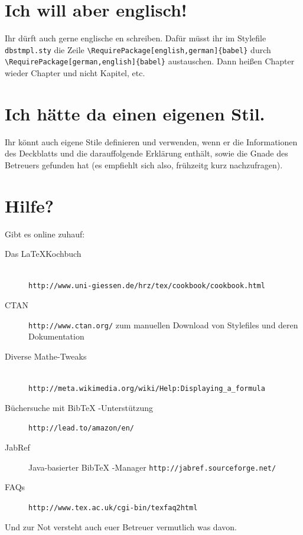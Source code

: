 \documentclass[pdftex,12pt,a4paper]{report}
\begin{document}
\section{Ich will aber englisch!}

Ihr d\"urft auch gerne englische \the\arbeit en schreiben. Daf\"ur m\"usst
ihr im Stylefile {\tt dbstmpl.sty} die Zeile
\verb=\RequirePackage[english,german]{babel}= durch
\verb=\RequirePackage[german,english]{babel}= austauschen. Dann hei\ss en
Chapter wieder Chapter und nicht Kapitel, etc.

\section{Ich h\"atte da einen eigenen Stil.}

Ihr k\"onnt auch eigene Stile definieren und verwenden, wenn er die
Informationen des Deckblatts und die darauffolgende Erkl\"arung
enth\"alt, sowie die Gnade des Betreuers gefunden hat (es
empfiehlt sich also, fr\"uhzeitg kurz nachzufragen).

\section{Hilfe?}

Gibt es online zuhauf:

\begin{description}
  \item[Das \LaTeX Kochbuch]~\\{\tt http://www.uni-giessen.de/hrz/tex/cookbook/cookbook.html}
  \item[CTAN] {\tt http://www.ctan.org/} zum manuellen Download von Stylefiles
      und deren Dokumentation
  \item[Diverse Mathe-Tweaks]~\\ \verb=http://meta.wikimedia.org/wiki/Help:Displaying_a_formula=
  \item[B\"uchersuche mit BibTeX -Unterst\"utzung] {\tt http://lead.to/amazon/en/}
  \item[JabRef] Java-basierter BibTeX -Manager {\tt http://jabref.sourceforge.net/}
  \item[FAQs] {\tt http://www.tex.ac.uk/cgi-bin/texfaq2html}
\end{description}

Und zur Not versteht auch euer Betreuer vermutlich was davon.


\listoffigures

\listoftables

\end{document}
